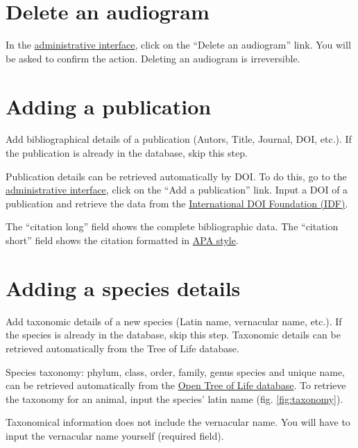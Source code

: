 \documentclass{article}
\begin{document}
\section{Delete an audiogram}
In the \href{https://animalaudiograms.museumfuernaturkunde.berlin/admin/v1/start}{administrative interface}, click on the ``Delete an audiogram'' link. You will be asked to confirm the action. Deleting an audiogram is irreversible.

\section{Adding a publication}
Add bibliographical details of a publication (Autors, Title, Journal, DOI, etc.). If the publication is already in the database, skip this step.

Publication details can be retrieved automatically by DOI. To do this, go to the \href{https://animalaudiograms.museumfuernaturkunde.berlin/admin/v1/start}{administrative interface}, click on the ``Add a publication'' link. Input a DOI of a publication and retrieve the data from the \href{https://www.doi.org/}{International DOI Foundation (IDF)}.

The ``citation long'' field shows the complete bibliographic data. The ``citation short'' field shows the citation formatted in \href{https://apastyle.apa.org}{APA style}.

\section{Adding a species details}
Add taxonomic details of a new species (Latin name, vernacular name, etc.). If the species is already in the database, skip this step. Taxonomic details can be retrieved automatically from the Tree of Life database.

Species taxonomy: phylum, class, order, family, genus species and unique name, can be retrieved automatically from the \href{https://opentreeoflife.github.io}{Open Tree of Life database}. To retrieve the taxonomy for an animal, input the species' latin name (fig. \ref{fig:taxonomy}).

Taxonomical information does not include the vernacular name. You will have to input the vernacular name yourself (required field).
\end{document}
